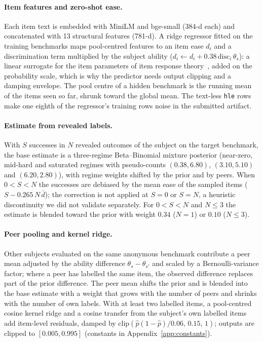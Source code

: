 \documentclass{article}
\begin{document}
\paragraph{Item features and zero-shot ease.}
\label{sec:items}
Each item text is embedded with MiniLM and bge-small (384-d each) and concatenated with 13 structural features (781-d). A ridge regressor fitted on the training benchmarks maps pool-centred features to an item ease $d_i$ and a discrimination term multiplied by the subject ability ($d_i \leftarrow d_i + 0.38\,\text{disc}_i\,\theta_s$): a linear surrogate for the item parameters of item response theory~\cite{lord}, added on the probability scale, which is why the predictor needs output clipping and a damping envelope. The pool centre of a hidden benchmark is the running mean of the items seen so far, shrunk toward the global mean. The text-less \texttt{hle} rows make one eighth of the regressor's training rows noise in the submitted artifact.

\paragraph{Estimate from revealed labels.}
\label{sec:posterior}
With $S$ successes in $N$ revealed outcomes of the subject on the target benchmark, the base estimate is a three-regime Beta--Binomial mixture posterior (near-zero, mid-hard and saturated regimes with pseudo-counts $(0.38,6.80)$, $(3.10,5.10)$ and $(6.20,2.80)$), with regime weights shifted by the prior and by peers. When $0<S<N$ the successes are debiased by the mean ease of the sampled items ($S-0.265\,N\,\bar d$); the correction is not applied at $S=0$ or $S=N$, a heuristic discontinuity we did not validate separately. For $0<S<N$ and $N\le 3$ the estimate is blended toward the prior with weight $0.34$ ($N=1$) or $0.10$ ($N\le3$).

\paragraph{Peer pooling and kernel ridge.}
\label{sec:peer}
Other subjects evaluated on the same anonymous benchmark contribute a peer mean adjusted by the ability difference $\theta_s-\theta_{s'}$ and scaled by a Bernoulli-variance factor; where a peer has labelled the same item, the observed difference replaces part of the prior difference. The peer mean shifts the prior and is blended into the base estimate with a weight that grows with the number of peers and shrinks with the number of own labels. With at least two labelled items, a pool-centred cosine kernel ridge and a cosine transfer from the subject's own labelled items add item-level residuals, damped by $\text{clip}(\hat p(1-\hat p)/0.06,\,0.15,\,1)$; outputs are clipped to $[0.005,0.995]$ (constants in Appendix~\ref{app:constants}).
\end{document}
